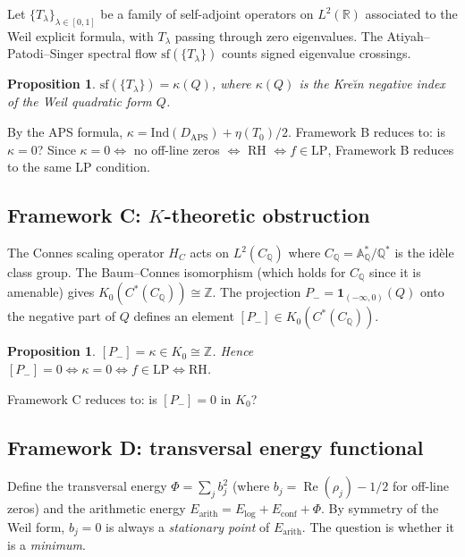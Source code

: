 \documentclass[11pt]{amsart}
\newtheorem{proposition}[theorem]{Proposition}
\renewcommand{\Re}{\operatorname{Re}}
\newcommand{\LP}{\mathrm{LP}}
\begin{document}
Let $\{T_\lambda\}_{\lambda \in [0,1]}$ be a family of self-adjoint operators on $L^2(\mathbb{R})$
associated to the Weil explicit formula, with $T_\lambda$ passing through zero eigenvalues.
The Atiyah--Patodi--Singer spectral flow $\mathrm{sf}(\{T_\lambda\})$ counts signed eigenvalue
crossings.

\begin{proposition}
$\mathrm{sf}(\{T_\lambda\}) = \kappa(Q)$, where $\kappa(Q)$ is the Kre\u{\i}n negative
index of the Weil quadratic form $Q$.
\end{proposition}

By the APS formula, $\kappa = \mathrm{Ind}(D_{\mathrm{APS}}) + \eta(T_0)/2$.
Framework B reduces to: is $\kappa = 0$?  Since $\kappa = 0 \iff$ no off-line zeros
$\iff$ RH $\iff f \in \LP$, Framework B reduces to the same LP condition.

\subsection{Framework C: $K$-theoretic obstruction}

The Connes scaling operator $H_C$ acts on $L^2(C_\mathbb{Q})$ where
$C_\mathbb{Q} = \mathbb{A}_\mathbb{Q}^*/\mathbb{Q}^*$ is the id\`ele class group.
The Baum--Connes isomorphism (which holds for $C_\mathbb{Q}$ since it is amenable) gives
$K_0(C^*(C_\mathbb{Q})) \cong \mathbb{Z}$.
The projection $P_- = \mathbf{1}_{(-\infty,0)}(Q)$ onto the negative part of $Q$ defines
an element $[P_-] \in K_0(C^*(C_\mathbb{Q}))$.

\begin{proposition}
$[P_-] = \kappa \in K_0 \cong \mathbb{Z}$.
Hence $[P_-] = 0 \iff \kappa = 0 \iff f \in \LP \iff \mathrm{RH}$.
\end{proposition}

Framework C reduces to: is $[P_-] = 0$ in $K_0$?

\subsection{Framework D: transversal energy functional}

Define the transversal energy $\Phi = \sum_j b_j^2$ (where $b_j = \Re(\rho_j) - 1/2$
for off-line zeros) and the arithmetic energy $E_\mathrm{arith} = E_\mathrm{log} + E_\mathrm{conf} + \Phi$.
By symmetry of the Weil form, $b_j = 0$ is always a \emph{stationary point} of
$E_\mathrm{arith}$.  The question is whether it is a \emph{minimum}.
\end{document}
